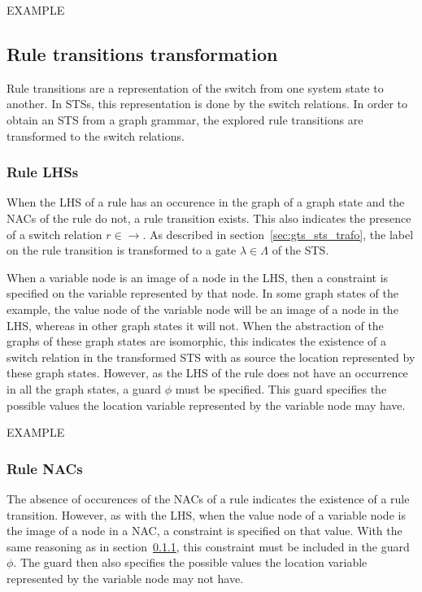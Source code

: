 EXAMPLE

\subsection{Rule transitions transformation}
Rule transitions are a representation of the switch from one system state to another. In STSs, this representation is done by the switch relations. In order to obtain an STS from a graph grammar, the explored rule transitions are transformed to the switch relations.

\subsubsection{Rule LHSs}\label{sec:rule_lhss}
When the LHS of a rule has an occurence in the graph of a graph state and the NACs of the rule do not, a rule transition exists. This also indicates the presence of a switch relation $r \in \rightarrow$. As described in section~\ref{sec:gts_sts_trafo}, the label on the rule transition is transformed to a gate $\lambda \in \Lambda$ of the STS.

When a variable node is an image of a node in the LHS, then a constraint is specified on the variable represented by that node. In some graph states of the example, the value node of the variable node will be an image of a node in the LHS, whereas in other graph states it will not. When the abstraction of the graphs of these graph states are isomorphic, this indicates the existence of a switch relation in the transformed STS with as source the location represented by these graph states. However, as the LHS of the rule does not have an occurrence in all the graph states, a guard $\phi$ must be specified. This guard specifies the possible values the location variable represented by the variable node may have. 

EXAMPLE

\subsubsection{Rule NACs}
The absence of occurences of the NACs of a rule indicates the existence of a rule transition. However, as with the LHS, when the value node of a variable node is the image of a node in a NAC, a constraint is specified on that value. With the same reasoning as in section~\ref{sec:rule_lhss}, this constraint must be included in the guard $\phi$. The guard then also specifies the possible values the location variable represented by the variable node may not have.

